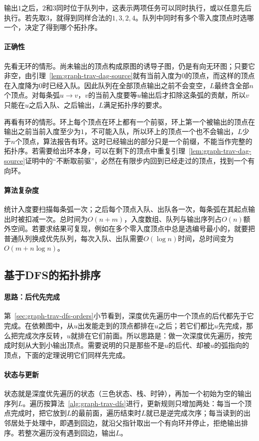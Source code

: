 输出$1$之后，$2$和$3$同时位于队列中，这表示两项任务可以同时执行，或以任意先后执行。若先取$3$，就得到同样合法的$1,3,2,4$。队列中同时有多个零入度顶点时选哪一个，决定了得到哪个拓扑序。

\paragraph{正确性}
先看无环的情形。尚未输出的顶点构成原图的诱导子图，仍是有向无环图；只要它非空，由引理~\ref{lem:graph-trav-dag-source}就有当前入度为$0$的顶点，而这样的顶点在入度降为$0$时已经入队。因此队列在全部顶点输出之前不会变空，$L$最终含全部$n$个顶点。对每条弧$u\to v$，$v$的当前入度要等$u$输出后才扣除这条弧的贡献，所以$v$只能在$u$之后入队、之后输出，$L$满足拓扑序的要求。

再看有环的情形。环上每个顶点在环上都有一个前驱，环上第一个被输出的顶点在输出之前当前入度至少为$1$，不可能入队，所以环上的顶点一个也不会输出，$L$少于$n$个顶点，算法报告有环。这时已经输出的部分只是一个前缀，不能当作完整的拓扑序。若需要给出环本身，可以在剩下的顶点中重复引理~\ref{lem:graph-trav-dag-source}证明中的“不断取前驱”，必然在有限步内回到已经走过的顶点，找到一个有向环。

\paragraph{算法复杂度}
统计入度要扫描每条弧一次；之后每个顶点入队、出队各一次，每条弧在其起点输出时被扣减一次。总时间为$O(n+m)$，入度数组、队列与输出序列占$O(n)$额外空间。若要求结果可复现，例如在多个零入度顶点中总是选编号最小的，就要把普通队列换成优先队列，每次入队、出队需要$O(\log n)$时间，总时间变为$O(m+n\log n)$。

\subsection{基于DFS的拓扑排序}
\label{sec:graph-trav-dfs-toposort}

\paragraph{思路：后代先完成}
第~\ref{sec:graph-trav-dfs-orders}小节看到，深度优先遍历中一个顶点的后代都先于它完成。在依赖图中，从$u$出发能走到的顶点都排在$u$之后；若它们都比$u$先完成，那么把完成次序反转，$u$就排在它们前面。所以思路是：做一次深度优先遍历，按完成时刻从大到小输出顶点。需要说明的只是那些不是$u$的后代、却被$u$的弧指向的顶点，下面的定理说明它们同样先完成。

\paragraph{状态与更新}
状态就是深度优先遍历的状态（三色状态、栈、时钟），再加一个初始为空的输出序列$L$。遍历按算法~\ref{alg:graph-trav-dfs}进行，更新规则只增加两处：每当一个顶点完成时，把它放到$L$的最前面，遍历结束时$L$就已是逆完成次序；每当读到的出邻居处于处理中，即遇到回边，就沿父指针取出一个有向环并停止，拒绝输出排序。若整次遍历没有遇到回边，输出$L$。

